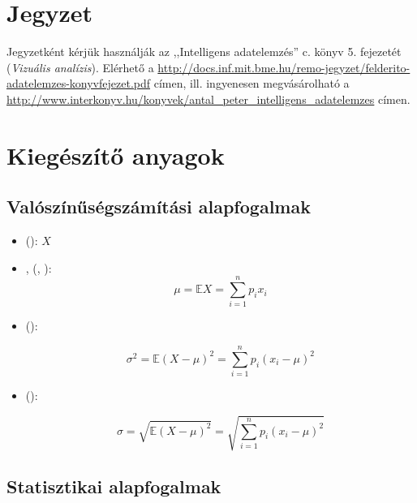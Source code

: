 
\section{Jegyzet}

Jegyzetként kérjük használják az ,,Intelligens adatelemzés'' c. könyv 5. fejezetét (\emph{Vizuális analízis}). Elérhető a \url{http://docs.inf.mit.bme.hu/remo-jegyzet/felderito-adatelemzes-konyvfejezet.pdf} címen, ill. ingyenesen megvásárolható a \url{http://www.interkonyv.hu/konyvek/antal_peter_intelligens_adatelemzes} címen.

\section{Kiegészítő anyagok\kieg}

\subsection{Valószínűségszámítási alapfogalmak}

\begin{definicio}
	\begin{itemize}
		\item {} (): $X$
		\item {},  (, ):
		$$\mu = \mathbb{E}X = \sum_{i=1}^{n} p_i x_i$$

		\item {} ():

		$$\sigma^2 = \mathbb{E}\left(X-\mu\right)^2 = \sum_{i=1}^{n} p_i (x_i - \mu)^2$$

		\item {} ():

		$$\sigma = \sqrt{\mathbb{E}\left(X-\mu\right)^2} = \sqrt{\sum_{i=1}^{n} p_i (x_i - \mu)^2}$$
	\end{itemize}
\end{definicio}

\subsection{Statisztikai alapfogalmak}

